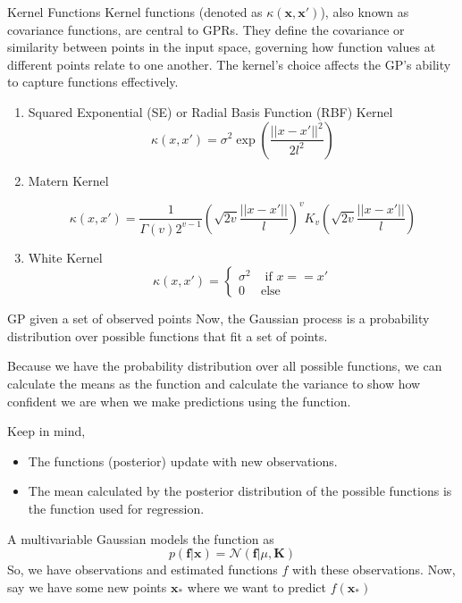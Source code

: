 \documentclass[10pt]{beamer}
\begin{document}
\begin{frame}[fragile]{Kernel Functions}  %
	Kernel functions (denoted as $\kappa(\mathbf{x}, \mathbf{x}′)$), also known as covariance functions, are central to GPRs.
	They define the covariance or similarity between points in the input space, governing how function values at different points relate to one another. The kernel's choice affects the GP's ability to capture functions effectively.
	\begin{enumerate}
		\item Squared Exponential (SE) or Radial Basis Function (RBF) Kernel
		$$ \kappa(x, x') = \sigma^2 \exp \left(\frac{||x - x'||^2}{2l^2}\right)$$
		\item  Matern Kernel
		
		$$ \kappa (x, x') =  \frac{1}{\Gamma (v) 2^{v-1}} \left(\sqrt{2v} \frac{||x -x'||}{l}\right)^v K_v \left(\sqrt{2v} \frac{||x -x'||}{l}\right)$$
		\item White Kernel 
		$$ \kappa (x, x') = \begin{cases}
			\sigma^2 & \text{ if } x==x' \\ 
			0 & \text{else}
		\end{cases}$$
	\end{enumerate}
\end{frame}

\begin{frame}{GP given a set of observed points}
	Now,  the Gaussian process is a probability distribution over possible functions that fit a set of points.
	
	Because we have the probability distribution over all possible functions, we can calculate the means as the function and calculate the variance to show how confident we are when we make predictions using the function.
	
	Keep in mind, 
	\begin{itemize}
		\item The functions (posterior) update with new observations. 
		\item The mean calculated by the posterior distribution of the possible functions is the function used for regression.
	\end{itemize}
	A multivariable Gaussian models the function as 
	$$ p(\mathbf{f}| \mathbf{x}) = \mathcal{N} (\mathbf{f}| \mu, \mathbf{K})$$
	So, we have observations and estimated functions $f$ with these observations. Now, say we have some new points $\mathbf{x}_*$ where we want to predict $f(\mathbf{x}_*)$
\end{frame}
\end{document}
